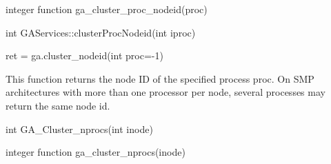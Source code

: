 \documentclass[10pt]{article}
\begin{document}
\begin{fapi}
\begin{fcode}
integer function ga_cluster_proc_nodeid(proc)
\end{fcode}
\begin{funcargs}
\end{funcargs}
\end{fapi}

\begin{cxxapi}
\begin{cxxcode}
int GAServices::clusterProcNodeid(int iproc)
\end{cxxcode}
\begin{funcargs}
\end{funcargs}
\end{cxxapi}

\begin{pyapi}
\begin{pycode}
ret = ga.cluster_nodeid(int proc=-1)
\end{pycode}
\begin{funcargs}
\end{funcargs}
\end{pyapi}

\local

\begin{desc}

This function returns the node ID of the specified process proc.  On SMP
architectures with more than one processor per node, several processes may
return the same node id.

\end{desc}


\begin{capi}
\begin{ccode}
int GA_Cluster_nprocs(int inode)
\end{ccode}
\begin{funcargs}
\end{funcargs}
\end{capi}

\begin{fapi}
\begin{fcode}
integer function ga_cluster_nprocs(inode)
\end{fcode}
\begin{funcargs}
\end{funcargs}
\end{fapi}
\end{document}
